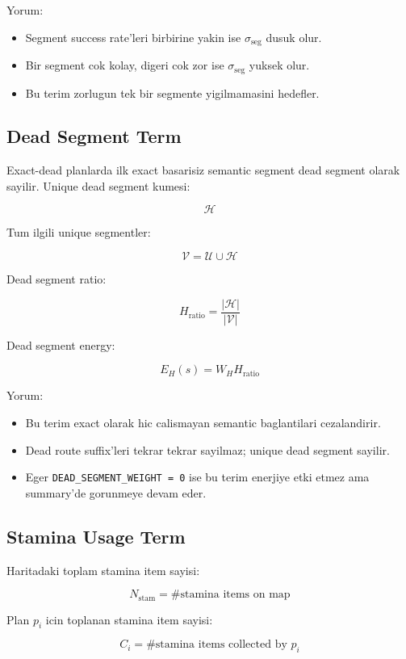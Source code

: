 \documentclass[11pt]{article}
\begin{document}
Yorum:

\begin{itemize}
  \item Segment success rate'leri birbirine yakin ise $\sigma_{\text{seg}}$ dusuk olur.
  \item Bir segment cok kolay, digeri cok zor ise $\sigma_{\text{seg}}$ yuksek olur.
  \item Bu terim zorlugun tek bir segmente yigilmamasini hedefler.
\end{itemize}

\subsection{Dead Segment Term}

Exact-dead planlarda ilk exact basarisiz semantic segment dead segment olarak sayilir.
Unique dead segment kumesi:

\[
\mathcal{H}
\]

Tum ilgili unique segmentler:

\[
\mathcal{V}
=
\mathcal{U}
\cup
\mathcal{H}
\]

Dead segment ratio:

\[
H_{\text{ratio}}
=
\frac{|\mathcal{H}|}{|\mathcal{V}|}
\]

Dead segment energy:

\[
E_H(s)
=
W_H H_{\text{ratio}}
\]

Yorum:

\begin{itemize}
  \item Bu terim exact olarak hic calismayan semantic baglantilari cezalandirir.
  \item Dead route suffix'leri tekrar tekrar sayilmaz; unique dead segment sayilir.
  \item Eger \texttt{DEAD\_SEGMENT\_WEIGHT = 0} ise bu terim enerjiye etki etmez ama summary'de gorunmeye devam eder.
\end{itemize}

\subsection{Stamina Usage Term}

Haritadaki toplam stamina item sayisi:

\[
N_{\text{stam}}
=
\#\text{stamina items on map}
\]

Plan $p_i$ icin toplanan stamina item sayisi:

\[
C_i
=
\#\text{stamina items collected by } p_i
\]
\end{document}
